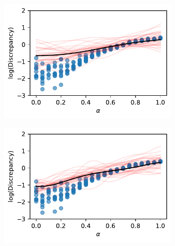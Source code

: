 \begin{figure}[htbp]
    \centering
    \begin{subfigure}[b]{0.5\textwidth}
        \centering
        \includegraphics[width=\textwidth]{
            ../champagne_GP_images/initial_alpha_slice_log_discrep.pdf
        }
    \end{subfigure}%
    \hfill%
    \begin{subfigure}[b]{0.5\textwidth}
        \centering
        \includegraphics[width=\textwidth]{
            ../champagne_GP_images/alpha_slice_400_bolfi_updates_log_discrep.pdf
        }
    \end{subfigure}
    \hfill%
    \begin{subfigure}[b]{0.5\textwidth}
        \centering

\end{subfigure}
\end{figure}
